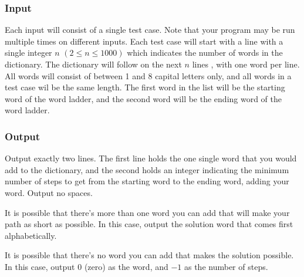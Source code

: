 \subsubsection{Input}
Each input will consist of a single test case.
Note that your program may be run multiple times on different inputs.
Each test case will start with a line with a single integer $n$ $(2 \le n \le 1000)$ which indicates the number of words in the dictionary.
The dictionary will follow on the next $n$ lines , with one word per line.
All words will consist of between 1 and 8 capital letters only, and all words in a test case wil be the same length.
The first word in the list will be the starting word of the word ladder, and the second word will be the ending word of the word ladder.

\subsubsection{Output}
Output exactly two lines.
The first line holds the one single word that you would add to the dictionary, and the second holds an integer indicating the minimum number of steps to get from the starting word to the ending word, adding your word. Output no spaces.

It is possible that there's more than one word you can add that will make your path as short as possible.
In this case, output the solution word that comes first alphabetically.

It is possible that there's no word you can add that makes the solution possible.
In this case, output $0$ (zero) as the word, and $-1$ as the number of steps.
